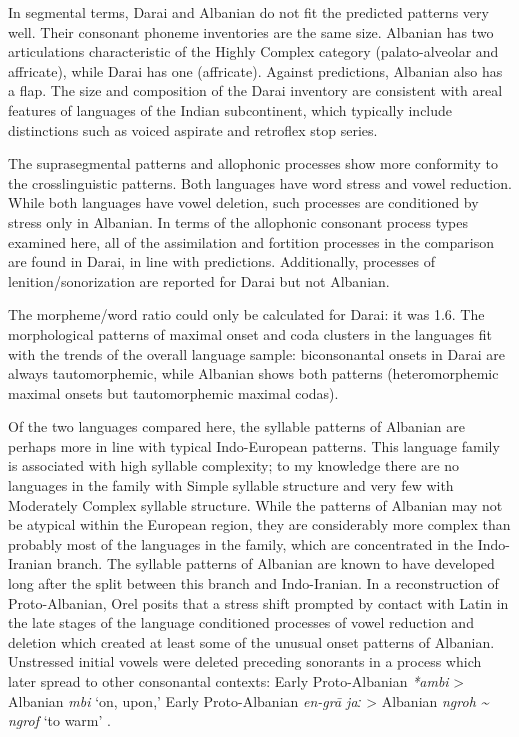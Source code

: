   In segmental terms, Darai and Albanian do not fit the predicted patterns very well. Their consonant phoneme inventories are the same size. Albanian has two articulations characteristic of the Highly Complex category (palato-alveolar and affricate), while Darai has one (affricate). Against predictions, Albanian also has a flap. The size and composition of the Darai inventory are consistent with areal features of languages of the Indian subcontinent, which typically include distinctions such as voiced aspirate and retroflex stop series.

  The suprasegmental patterns and allophonic processes show more conformity to the crosslinguistic patterns. Both languages have word stress and vowel reduction. While both languages have vowel deletion, such processes are conditioned by stress only in Albanian. In terms of the allophonic consonant process types examined here, all of the assimilation and fortition processes in the comparison are found in Darai, in line with predictions. Additionally, processes of lenition/sonorization are reported for Darai but not Albanian.

  The morpheme/word ratio could only be calculated for Darai: it was 1.6. The morphological patterns of maximal onset and coda clusters in the languages fit with the trends of the overall language sample: biconsonantal onsets in Darai are always tautomorphemic, while Albanian shows both patterns (heteromorphemic maximal onsets but tautomorphemic maximal codas).

  Of the two languages compared here, the syllable patterns of Albanian are perhaps more in line with typical Indo-European patterns. This language family is associated with high syllable complexity; to my knowledge there are no languages in the family with Simple syllable structure and very few with Moderately Complex syllable structure. While the patterns of Albanian may not be atypical within the European region, they are considerably more complex than probably most of the languages in the family, which are concentrated in the Indo-Iranian branch. The syllable patterns of Albanian are known to have developed long after the split between this branch and Indo-Iranian. In a reconstruction of Proto-Albanian, Orel posits that a stress shift prompted by contact with Latin in the late stages of the language conditioned processes of vowel reduction and deletion which created at least some of the unusual onset patterns of Albanian. Unstressed initial vowels were deleted preceding sonorants in a process which later spread to other consonantal contexts: Early Proto-Albanian \textit{*ambi} > Albanian \textit{mbi} ‘on, upon,’ Early Proto-Albanian \textit{en-gra\={} jaː} > Albanian \textit{ngroh {\textasciitilde} ngrof} ‘to warm’ \citep[22]{Orel2000}.


